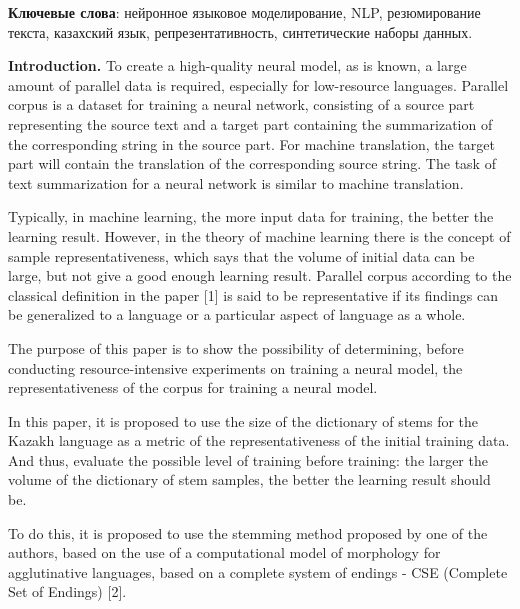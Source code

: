 {\bfseries Ключевые слова}: нейронное языковое моделирование, NLP,
резюмирование текста, казахский язык, репрезентативность, синтетические
наборы данных.

\begin{multicols}{2}
{\bfseries Introduction.} To create a high-quality neural model, as is
known, a large amount of parallel data is required, especially for
low-resource languages. Parallel corpus is a dataset for training a
neural network, consisting of a source part representing the source text
and a target part containing the summarization of the corresponding
string in the source part. For machine translation, the target part will
contain the translation of the corresponding source string. The task of
text summarization for a neural network is similar to machine
translation.

Typically, in machine learning, the more input data for training, the
better the learning result. However, in the theory of machine learning
there is the concept of sample representativeness, which says that the
volume of initial data can be large, but not give a good enough learning
result. Parallel corpus according to the classical definition in the
paper {[}1{]} is said to be representative if its findings can be
generalized to a language or a particular aspect of language as a whole.

The purpose of this paper is to show the possibility of determining,
before conducting resource-intensive experiments on training a neural
model, the representativeness of the corpus for training a neural model.

In this paper, it is proposed to use the size of the dictionary of stems
for the Kazakh language as a metric of the representativeness of the
initial training data. And thus, evaluate the possible level of training
before training: the larger the volume of the dictionary of stem
samples, the better the learning result should be.

To do this, it is proposed to use the stemming method proposed by one of
the authors, based on the use of a computational model of morphology for
agglutinative languages, based on a complete system of endings - CSE
(Complete Set of Endings) {[}2{]}.


\end{multicols}

